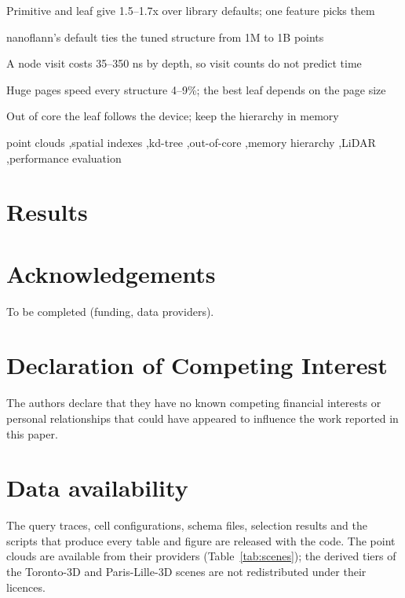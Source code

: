 \documentclass[a4paper,fleqn]{cas-dc}
\newif\ifanonymous
\begin{document}
\begin{highlights}
\item Primitive and leaf give 1.5--1.7x over library defaults; one feature picks them
\item nanoflann's default ties the tuned structure from 1M to 1B points
\item A node visit costs 35--350 ns by depth, so visit counts do not predict time
\item Huge pages speed every structure 4--9\%; the best leaf depends on the page size
\item Out of core the leaf follows the device; keep the hierarchy in memory
\end{highlights}

\begin{keywords}
point clouds \sep spatial indexes \sep kd-tree \sep out-of-core \sep memory hierarchy \sep LiDAR \sep performance evaluation
\end{keywords}

\maketitle





\section{Results}\label{sec:results}


\FloatBarrier


\FloatBarrier

\FloatBarrier



\appendix

\FloatBarrier

\ifanonymous\else
\section*{Acknowledgements}
To be completed (funding, data providers).
\fi

\section*{Declaration of Competing Interest}
The authors declare that they have no known competing financial interests or personal relationships that could have appeared to influence the work reported in this paper.

\section*{Data availability}
The query traces, cell configurations, schema files, selection results and the scripts that produce every table and figure are released with the code. The point clouds are available from their providers (Table~\ref{tab:scenes}); the derived tiers of the Toronto-3D and Paris-Lille-3D scenes are not redistributed under their licences.



\end{document}
